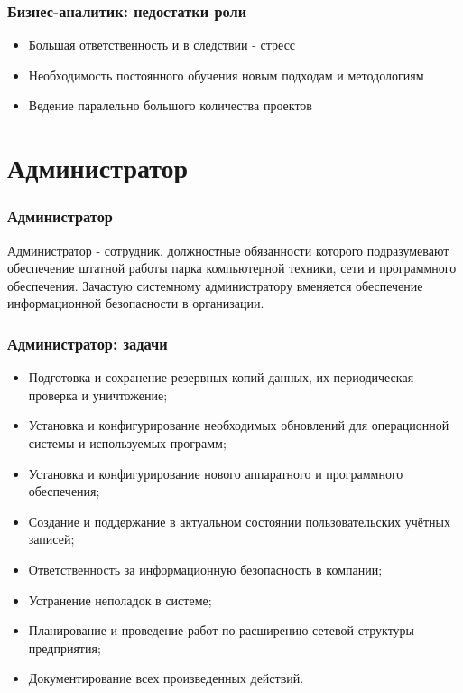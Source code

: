 \documentclass{../industrial-development}
\begin{document}
	\begin{frame} \frametitle{Бизнес-аналитик: недостатки роли}
		\begin{itemize}
			\item Большая ответственность и в следствии - стресс
			\item Необходимость постоянного обучения новым подходам и методологиям
			\item Ведение паралельно большого количества проектов
		\end{itemize}
	\end{frame}
	
	
	\section{Администратор} 
	
	\begin{frame} \frametitle{Администратор}
		\begin{block}{}
			\alert {Администратор} - сотрудник, должностные обязанности которого подразумевают обеспечение штатной работы парка компьютерной техники, сети и программного обеспечения. Зачастую системному администратору вменяется обеспечение информационной безопасности в организации.
		\end{block}
	\end{frame}

	\begin{frame} \frametitle{Администратор: задачи}
		\begin{itemize}
			\item Подготовка и сохранение резервных копий данных, их периодическая проверка и уничтожение;
			\item Установка и конфигурирование необходимых обновлений для операционной системы и используемых программ;
			\item Установка и конфигурирование нового аппаратного и программного обеспечения;
			\item Создание и поддержание в актуальном состоянии пользовательских учётных записей;
			\item Ответственность за информационную безопасность в компании;
			\item Устранение неполадок в системе;
			\item Планирование и проведение работ по расширению сетевой структуры предприятия;
			\item Документирование всех произведенных действий.
		\end{itemize}
	\end{frame}
\end{document}
